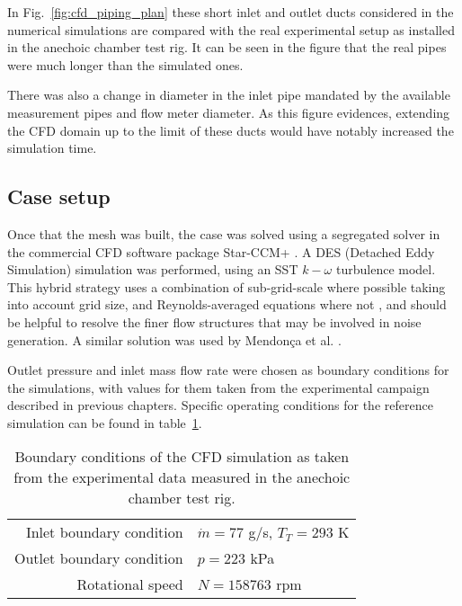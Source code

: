 In Fig.~\ref{fig:cfd_piping_plan} these short inlet and outlet ducts considered in the numerical simulations are compared with the real experimental setup as installed in the anechoic chamber test rig. It can be seen in the figure that the real pipes were much longer than the simulated ones. 

There was also a change in diameter in the inlet pipe mandated by the available measurement pipes and flow meter diameter. As this figure evidences, extending the CFD domain up to the limit of these ducts would have notably increased the simulation time.

\subsection{Case setup}

Once that the mesh was built, the case was solved using a segregated solver in the commercial CFD software package Star-CCM+ \cite{starccm}. A DES (Detached Eddy Simulation) simulation was performed, using an SST $k-\omega$ turbulence model. This hybrid strategy \cite{shur2008hybrid} uses a combination of sub-grid-scale where possible taking into account grid size, and Reynolds-averaged equations where not \cite{travin2000detached}, and should be helpful to resolve the finer flow structures that may be involved in noise generation. A similar solution was used by Mendonça et al. \cite{baris2011automotive,mendonca2012simulation}.

Outlet pressure and inlet mass flow rate were chosen as boundary conditions for the simulations, with values for them taken from the experimental campaign described in previous chapters. Specific operating conditions for the reference simulation can be found in table~\ref{tab:operatingConditions}.

\begin{table}
\centering
\caption{Boundary conditions of the CFD simulation as taken from the experimental data measured in the anechoic chamber test rig.}
\footnotesize
\begin{tabular}{rl}
\toprule
Inlet boundary condition & $\dot{m}=77$ g/s, $T_T=293$ K\\
Outlet boundary condition &  $p=223$ kPa \\
Rotational speed & $N=158763$ rpm \\ \bottomrule
\end{tabular}
\label{tab:operatingConditions}
\end{table}


